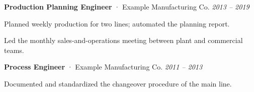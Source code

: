 \item \textbf{Production Planning Engineer} · Example Manufacturing Co. \hfill \textit{2013 -- 2019}
\begin{cvbullets}
  \item Planned weekly production for two lines; automated the planning report.
  \item Led the monthly sales-and-operations meeting between plant and commercial teams.
\end{cvbullets}
\item \textbf{Process Engineer} · Example Manufacturing Co. \hfill \textit{2011 -- 2013}
\begin{cvbullets}
  \item Documented and standardized the changeover procedure of the main line.
\end{cvbullets}
